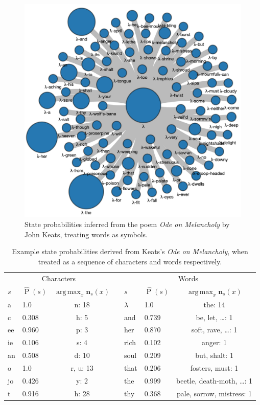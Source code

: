 \documentclass[12pt,a4paper]{article}
\newcommand\ub[1]{\symbf{#1}}                 %
\DeclareMathOperator\Pb{P}                    %
\DeclareMathOperator*{\argmax}{arg\,max}
\begin{document}
\begin{figure}[htbp]
  \includegraphics[width=\textwidth]{figures/text 1w}
\caption{State probabilities inferred from the poem \textit{Ode on Melancholy}
  by John Keats, treating words as symbols.}
\label{fig:text 1w}
\end{figure}

\begin{table}[htbp]
\centering
\begin{tabular}{llccllc}
  \toprule
  \multicolumn{3}{c}{Characters} && \multicolumn{3}{c}{Words} \\
  \cmidrule{1-3} \cmidrule{5-7}
  \(s\) & \(\hat{\Pb}(s)\) & \(\argmax_x \ub{n}_s(x)\) &&
  \(s\) & \(\hat{\Pb}(s)\) & \(\argmax_x \ub{n}_s(x)\) \\
  \midrule
  a  & 1.0   & n: 18    && \(\lambda\) & 1.0   & the: 14                      \\
  c  & 0.308 & h: 5     && and         & 0.739 & be, let, \dots: 1            \\
  ee & 0.960 & p: 3     && her         & 0.870 & soft, rave, \dots: 1         \\
  ie & 0.106 & s: 4     && rich        & 0.102 & anger: 1                     \\
  an & 0.508 & d: 10    && soul        & 0.209 & but, shalt: 1                \\
  o  & 1.0   & r, u: 13 && that        & 0.206 & fosters, must: 1             \\
  jo & 0.426 & y: 2     && the         & 0.999 & beetle, death-moth, \dots: 1 \\
  t  & 0.916 & h: 28    && thy         & 0.368 & pale, sorrow, mistress: 1    \\
  \bottomrule
\end{tabular}
\caption{Example state probabilities derived from Keats's \textit{Ode on
  Melancholy}, when treated as a sequence of characters and words respectively.}
\label{tab:text 1}
\end{table}
\end{document}
